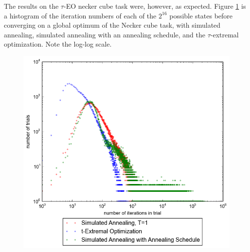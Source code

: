 \documentclass[12pt]{article}
\begin{document}
The results on the $\tau$-EO necker cube task were, however, as expected. Figure \ref{fig:speed} is a histogram of the iteration numbers of each of the $2^16$ possible states before converging on a global optimum of the Necker cube task, with simulated annealing, simulated annealing with an annealing schedule, and the $\tau$-extremal optimization. Note the log-log scale.

\begin{figure}
  \label{fig:speed}
  \includegraphics{iter_hist}
\end{figure}
\end{document}
